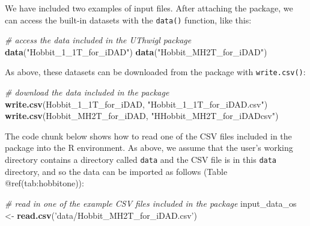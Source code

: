 \documentclass[]{elsarticle} %
\newenvironment{Shaded}{\begin{snugshade}}{\end{snugshade}}
\newcommand{\CommentTok}[1]{\textcolor[rgb]{0.56,0.35,0.01}{\textit{#1}}}
\newcommand{\DecValTok}[1]{\textcolor[rgb]{0.00,0.00,0.81}{#1}}
\newcommand{\KeywordTok}[1]{\textcolor[rgb]{0.13,0.29,0.53}{\textbf{#1}}}
\newcommand{\NormalTok}[1]{#1}
\newcommand{\StringTok}[1]{\textcolor[rgb]{0.31,0.60,0.02}{#1}}
\begin{document}
We have included two examples of input files. After attaching the package, we can access the built-in datasets with the \texttt{data()} function, like this:

\begin{Shaded}
\begin{Highlighting}[]
\CommentTok{# access the data included in the UThwigl package}
\KeywordTok{data}\NormalTok{(}\StringTok{"Hobbit_1_1T_for_iDAD"}\NormalTok{)}
\KeywordTok{data}\NormalTok{(}\StringTok{"Hobbit_MH2T_for_iDAD"}\NormalTok{)}
\end{Highlighting}
\end{Shaded}

As above, these datasets can be downloaded from the package with \texttt{write.csv()}:

\begin{Shaded}
\begin{Highlighting}[]
\CommentTok{# download the data included in the package}
\KeywordTok{write.csv}\NormalTok{(Hobbit_}\DecValTok{1}\NormalTok{_1T_for_iDAD, }\StringTok{"Hobbit_1_1T_for_iDAD.csv"}\NormalTok{)}
\KeywordTok{write.csv}\NormalTok{(Hobbit_MH2T_for_iDAD, }\StringTok{"HHobbit_MH2T_for_iDADcsv"}\NormalTok{)}
\end{Highlighting}
\end{Shaded}

The code chunk below shows how to read one of the CSV files included in the package into the R environment. As above, we assume that the user's working directory contains a directory called \texttt{data} and the CSV file is in this \texttt{data} directory, and so the data can be imported as follows (Table @ref(tab:hobbitone)):

\begin{Shaded}
\begin{Highlighting}[]
\CommentTok{# read in one of the example CSV files included in the package}
\NormalTok{input_data_os <-}
\StringTok{  }\KeywordTok{read.csv}\NormalTok{(}\StringTok{'data/Hobbit_MH2T_for_iDAD.csv'}\NormalTok{)}
\end{Highlighting}
\end{Shaded}

\newpage
\end{document}
